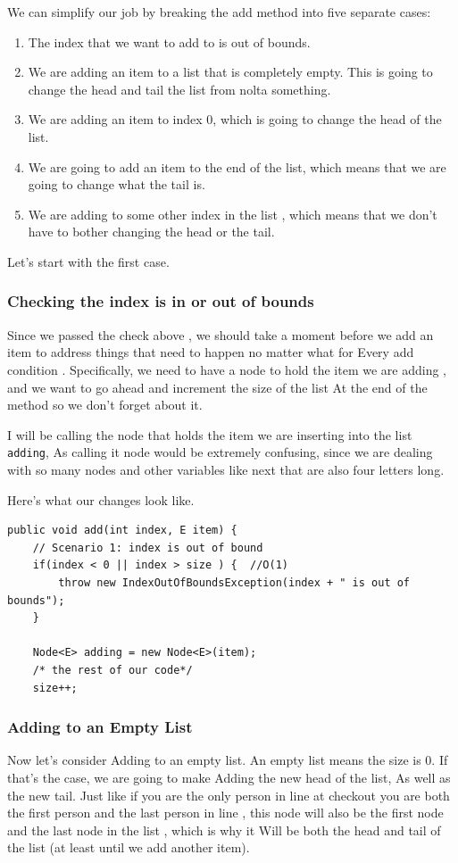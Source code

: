 \documentclass[10pt,a4paper]{book}
\begin{document}
We can simplify our job by breaking the add method into five separate cases:
\begin{enumerate}
	\item The index that we want to add to is out of bounds.
	\item We are adding an item to a list that is completely empty. This is going to change the head and tail the list from nolta something. 
	\item We are adding an item to index 0, which is going to change the head of the list.
	\item We are going to add an item to the end of the list, which means that we are going to change what the tail is.
	\item We are adding to some other index in the list , which means that we don't have to bother changing the head or the tail.
\end{enumerate}


Let's start with the first case.

\subsubsection{Checking the index is in or out of bounds}




Since we passed the check above , we should take a moment before we add an item to address things that need to happen no matter what for Every add condition . Specifically, we need to have a node to hold the item we are adding , and we want to go ahead and increment the size of the list At the end of the method so we don't forget about it.
 
I will be calling the node that holds the item we are inserting into the list \texttt{adding}, As calling it node would be extremely confusing, since we are dealing with so many nodes and other variables like next that are also four letters long.

Here's what our changes look like.

\begin{verbatim}
public void add(int index, E item) {
	// Scenario 1: index is out of bound
	if(index < 0 || index > size ) {  //O(1)
		throw new IndexOutOfBoundsException(index + " is out of bounds");
	}
	
	Node<E> adding = new Node<E>(item);
	/* the rest of our code*/
	size++;
\end{verbatim}



\subsubsection{Adding to an Empty List}
Now let's consider Adding to an empty list.  An empty list means the size is 0.  If that's the case, we are going to make Adding the new head of the list, As well as the new tail.  Just like if you are the only person in line at checkout you are both the first person and the last person in line , this node will also be the first node and the last node in the list , which is why it Will be both the head and tail of the list (at least until we add another item).
\end{document}
